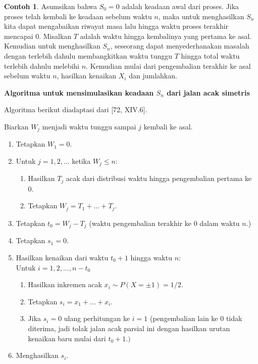 \documentclass[a4paper,12pt]{article}
\theoremstyle{definition}
\newtheorem{example}{Contoh}[section]
\begin{document}
\begin{example}
Asumsikan bahwa $S_0 = 0$ adalah keadaan awal dari proses. Jika proses telah kembali ke keadaan sebelum waktu $n$, maka untuk menghasilkan $S_n$ kita dapat mengabaikan riwayat masa lalu hingga waktu proses terakhir mencapai $0$. Misalkan $T$ adalah waktu hingga kembalinya yang pertama ke asal. Kemudian untuk menghasilkan $S_n$, seseorang dapat menyederhanakan masalah dengan terlebih dahulu membangkitkan waktu tunggu $T$ hingga total waktu terlebih dahulu melebihi $n$. Kemudian mulai dari pengembalian terakhir ke asal sebelum waktu $n$, hasilkan kenaikan $X_i$ dan jumlahkan.

\textbf{Algoritma untuk mensimulasikan keadaan $S_n$ dari jalan acak simetris}

Algoritma berikut diadaptasi dari [72, XIV.6].

Biarkan $W_j$ menjadi waktu tunggu sampai $j$ kembali ke asal.

\begin{enumerate}
    \item Tetapkan $W_1 = 0$.
    \item Untuk $j = 1, 2, ...$ ketika $W_j \leq n:$
        \begin{enumerate}
            \item Hasilkan $T_j$ acak dari distribusi waktu hingga pengembalian pertama ke 0.
            \item Tetapkan $W_j = T_1 + ... + T_j$.
        \end{enumerate}
    \item Tetapkan $t_0 = W_j - T_j$ (waktu pengembalian terakhir ke 0 dalam waktu $n$.)
    \item Tetapkan $s_1 = 0$.
    \item Hasilkan kenaikan dari waktu $t_0 + 1$ hingga waktu $n$:\\
    Untuk $i = 1, 2, ..., n - t_0$
        \begin{enumerate}
            \item Hasilkan inkremen acak $x_i \sim P(X = \pm 1) = 1/2$.
            \item Tetapkan $s_i = x_1 + ... + x_i$.
            \item Jika $s_i = 0$ ulang perhitungan ke $i = 1$ (pengembalian lain ke 0 tidak diterima, jadi tolak jalan acak parsial ini dengan hasilkan urutan kenaikan baru mulai dari $t_0 +1.)$
        \end{enumerate}
    \item Menghasilkan $s_i$.
\end{enumerate}


\end{example}
\end{document}
